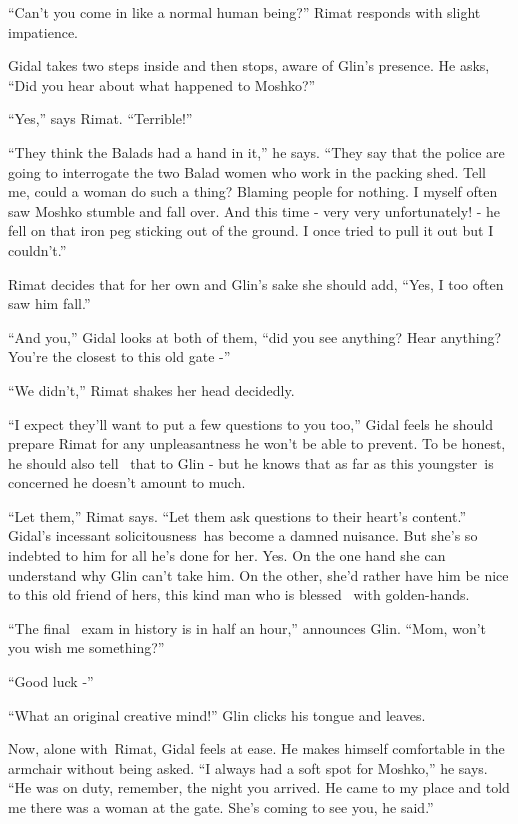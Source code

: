 \documentclass[twoside,11pt]{book}
\begin{document}
``Can't you come in like a normal human being?'' Rimat responds with slight
impatience{. \ }

Gidal takes two steps inside and then stops, aware of Glin's presence. He asks, ``Did you hear about what
happened to Moshko?''

``Yes,'' says Rimat. ``Terrible!''

``They think the Balads had a hand in it,'' he says. ``They say that the police
are going to interrogate the two Balad women who work in the packing shed. Tell me, could a woman do such a thing?
Blaming people for nothing. I myself often saw Moshko stumble and fall over. And this time - very very unfortunately! -
he fell on that iron peg sticking out of the ground. I once tried to pull it out but I couldn't.''

Rimat decides that for her own and Glin's sake she should add, ``Yes, I too often saw him
fall.''

``And you,'' Gidal looks at both of them, ``did you see anything? Hear anything?
You're the closest to this old gate -''

``We didn't,'' Rimat shakes her head decidedly.

``I expect they'll want to put a few questions to you too,'' Gidal feels he should prepare
Rimat for any unpleasantness he won't be able to prevent. To be honest, he should also tell \ that to Glin - but he
knows that as far as this youngster~is concerned he doesn't amount to much.

``Let them,'' Rimat says. ``Let them ask questions to their heart's
content.'' Gidal's incessant solicitousness~has become a damned nuisance. But she's so indebted to him for
all he's done for her. Yes. On the one hand she can understand why Glin can't take him. On the other, she'd rather have
him be nice to this old friend of hers, this kind man who is blessed \ with golden-hands.

``The final \ exam in history is in half an hour,'' announces Glin. ``Mom, won't
you wish me something?''

``Good luck -''

``What an original creative mind!'' Glin clicks his tongue and leaves.

Now, alone with~Rimat, Gidal feels at ease. He makes himself comfortable in the armchair without being asked.
``I always had a soft spot for Moshko,'' he says. ``He was on duty, remember,
the night you arrived. He came to my place and told me there was a woman at the gate. She's coming to see you, he
said.''
\end{document}
